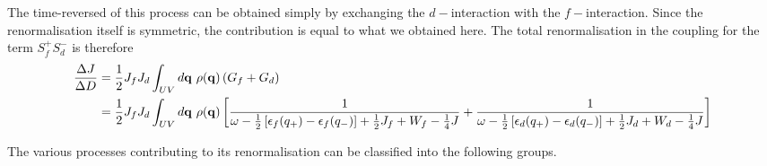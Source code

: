 \documentclass[%
reprint,
superscriptaddress,
groupedaddress,
superscriptaddress,
onecolumn,
10pt
]{revtex4-2}
\begin{document}
The time-reversed of this process can be obtained simply by exchanging the \(d-\)interaction with the \(f-\)interaction. Since the renormalisation itself is symmetric, the contribution is equal to what we obtained here. The total renormalisation in the coupling for the term \(S_f^+ S_d^-\) is therefore
\begin{equation}\begin{aligned}
	\frac{\Delta J}{\Delta D} &= \frac{1}{2}J_f J_d \int_{UV} d{\bf q} ~\rho({\bf q}) \left(G_f + G_d\right) \\
							  &= \frac{1}{2}J_f J_d \int_{UV} d{\bf q} ~\rho({\bf q}) \left[\frac{1}{\omega - \frac{1}{2}\left[\epsilon_f(q_+) - \epsilon_f(q_-)\right] + \frac{1}{2}J_f + W_f - \frac{1}{4}J} + \frac{1}{\omega - \frac{1}{2}\left[\epsilon_d(q_+) - \epsilon_d(q_-)\right] + \frac{1}{2}J_d + W_d - \frac{1}{4}J}\right]
\end{aligned}\end{equation}





\newpage

The various processes contributing to its renormalisation can be classified into the following groups.
\end{document}
